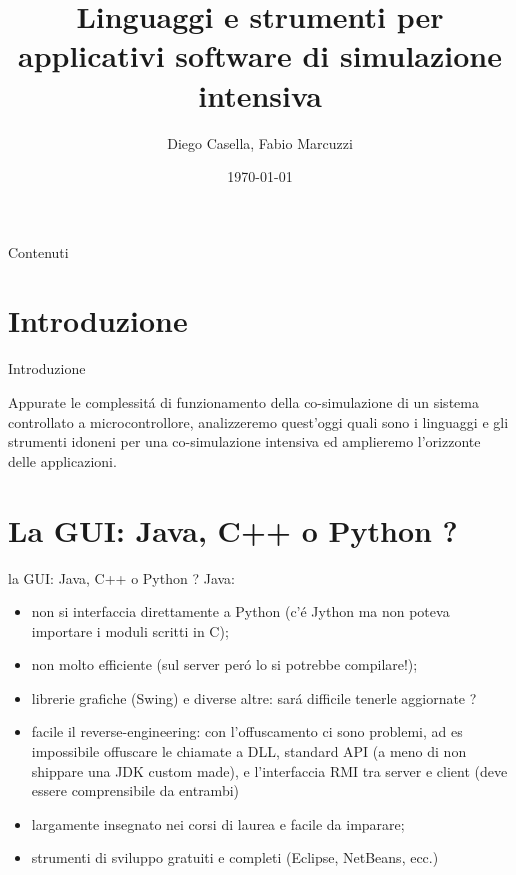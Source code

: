 \documentclass{beamer}
\title{Linguaggi e strumenti per applicativi software di simulazione intensiva}
\author{Diego Casella, Fabio Marcuzzi}
\date{\today}
\begin{document}
\maketitle

\begin{frame}{Contenuti} %
\tableofcontents
\end{frame}

\section{Introduzione}
\begin{frame}{Introduzione}

Appurate le complessit\'a di funzionamento della co-simulazione di un sistema controllato a microcontrollore,
analizzeremo quest'oggi quali sono i linguaggi e gli strumenti idoneni per una co-simulazione intensiva ed
amplieremo l'orizzonte delle applicazioni.

\end{frame}

\section{La GUI: Java, C++ o Python ?}
\begin{frame}{la GUI: Java, C++ o Python ?}
Java:
\begin{itemize}
\item non si interfaccia direttamente a Python (c'\'e Jython ma non poteva importare i moduli scritti in C);
\item non molto efficiente (sul server per\'o lo si potrebbe compilare!);
\item librerie grafiche (Swing) e diverse altre: sar\'a difficile tenerle aggiornate ?
\item facile il reverse-engineering: con l'offuscamento ci sono problemi, ad es impossibile offuscare le chiamate a DLL, standard API (a meno di non shippare una JDK custom made), e l'interfaccia RMI tra server e client (deve essere comprensibile da entrambi)
\item largamente insegnato nei corsi di laurea e facile da imparare;
\item strumenti di sviluppo gratuiti e completi (Eclipse, NetBeans, ecc.)
\end{itemize}

\end{frame}
\end{document}
